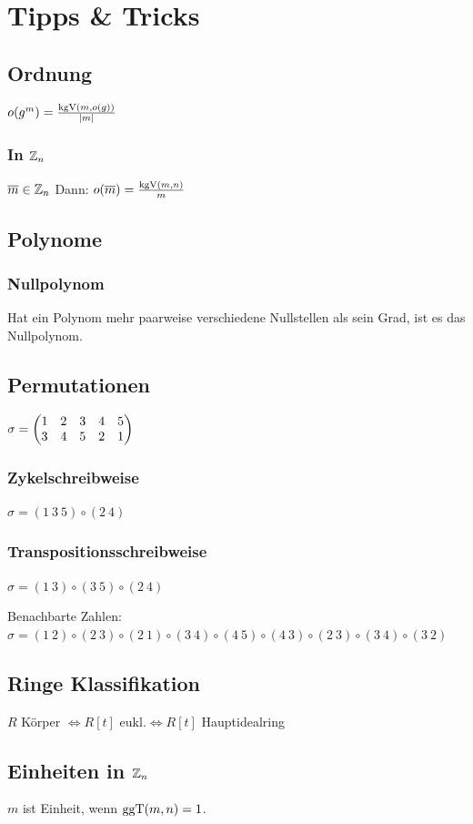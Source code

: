 \section*{Tipps \& Tricks}

\subsection*{Ordnung}
$o(g^m) = \frac{\operatorname{kgV}(m,o(g))}{|m|}$

\subsubsection*{In $\mathbb{Z}_n$}
$\overline m \in \mathbb{Z}_n$ Dann: $o(\overline m) = \frac{\operatorname{kgV}(m,n)}{m}$

\subsection*{Polynome}
\subsubsection*{Nullpolynom}
Hat ein Polynom mehr paarweise verschiedene Nullstellen als sein Grad,
ist es das Nullpolynom.

\subsection*{Permutationen}

$\displaystyle \sigma = \begin{pmatrix} 1 & 2 & 3 & 4 & 5 \\ 3 & 4 & 5 & 2 & 1 \end{pmatrix}$

\subsubsection*{Zykelschreibweise}
$\sigma = (1~3~5) \circ (2~4)$

\subsubsection*{Transpositionsschreibweise}
$\sigma = (1~3) \circ (3~5) \circ (2~4)$

Benachbarte Zahlen: \\
$\sigma = (1~2) \circ (2~3) \circ (2~1) \circ (3~4) \circ (4~5) \circ (4~3) \circ (2~3) \circ (3~4) \circ (3~2)$

\subsection*{Ringe Klassifikation}
$R$ Körper $\iff R[t]$ eukl.$\iff R[t]$ Hauptidealring

\subsection*{Einheiten in $\mathbb{Z}_n$}
$m$ ist Einheit, wenn $\operatorname{ggT}(m,n) = 1$.
